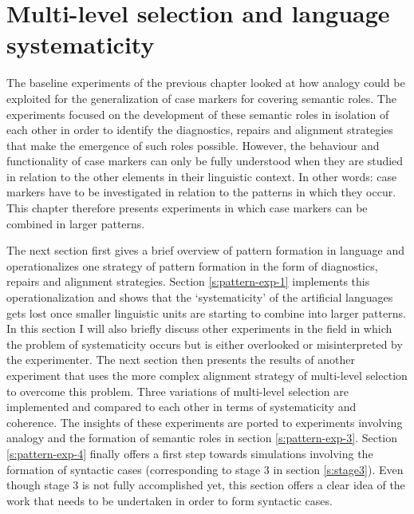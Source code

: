 
\setcounter{chapter}{3}
\chapter{Multi-level selection and language systematicity}
\label{c:experiment1}

The baseline experiments of the previous chapter looked at how analogy could be exploited for the generalization of case markers for covering semantic roles. The experiments focused on the development of these semantic roles in isolation of each other in order to identify the diagnostics, repairs and alignment strategies that make the emergence of such roles possible. However, the behaviour and functionality of case markers can only be fully understood when they are studied in relation to the other elements in their linguistic context. In other words: case markers have to be investigated in relation to the patterns in which they occur. This chapter therefore presents experiments in which case markers can be combined in larger patterns.

The next section first gives a brief overview of pattern formation in language and operationalizes one strategy of pattern formation in the form of diagnostics, repairs and alignment strategies. Section \ref{s:pattern-exp-1} implements this operationalization and shows that the `systematicity' of the artificial languages gets lost once smaller linguistic units are starting to combine into larger patterns. In this section I will also briefly discuss other experiments in the field in which the problem of systematicity occurs but is either overlooked or misinterpreted by the experimenter. The next section then presents the results of another experiment that uses the more complex alignment strategy of multi-level selection to overcome this problem. Three variations of multi-level selection are implemented and compared to each other in terms of systematicity and coherence. The insights of these experiments are ported to experiments involving analogy and the formation of semantic roles in section \ref{s:pattern-exp-3}. Section \ref{s:pattern-exp-4} finally offers a first step towards simulations involving the formation of syntactic cases (corresponding to stage 3 in section \ref{s:stage3}). Even though stage 3 is not fully accomplished yet, this section offers a clear idea of the work that needs to be undertaken in order to form syntactic cases.

